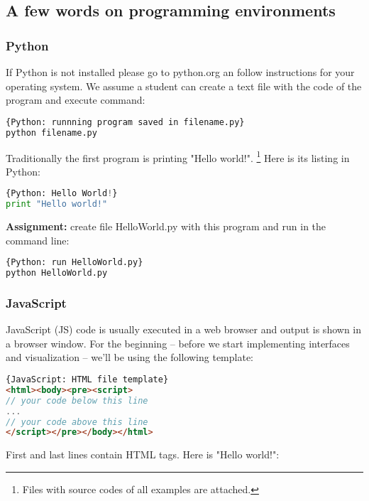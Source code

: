 \subsection{A few words on programming environments}
\subsubsection{Python}
If Python is not installed please go to python.org an follow
instructions for your operating system.
We assume a student can create a text file with the code of the program
and execute command:

\begin{lstlisting}[language=bash,style=codelst]{Python: runnning program saved in filename.py}
python filename.py
\end{lstlisting}

Traditionally the first program is printing "Hello world!".
\footnote{Files with source codes of all examples are attached.}
Here is its listing in Python:

\begin{lstlisting}[style=codelst, language=Python]{Python: Hello World!}
print "Hello world!"
\end{lstlisting}

\bigskip
\begin{tcolorbox}
\textbf{Assignment:} create file HelloWorld.py with this program
and run in the command line:
\begin{lstlisting}[language=bash,frame=single]{Python: run HelloWorld.py}
python HelloWorld.py
\end{lstlisting}
\end{tcolorbox}

\subsubsection{JavaScript}
JavaScript (JS) code is usually executed in a web browser
and output is shown in a browser window. For the beginning --
before we start implementing interfaces and
visualization -- we'll be using the following template:

\begin{lstlisting}[style=codelst,language=HTML]{JavaScript: HTML file template}
<html><body><pre><script>
// your code below this line
...
// your code above this line
</script></pre></body></html>
\end{lstlisting}
First and last lines contain HTML tags.
Here is "Hello world!":

